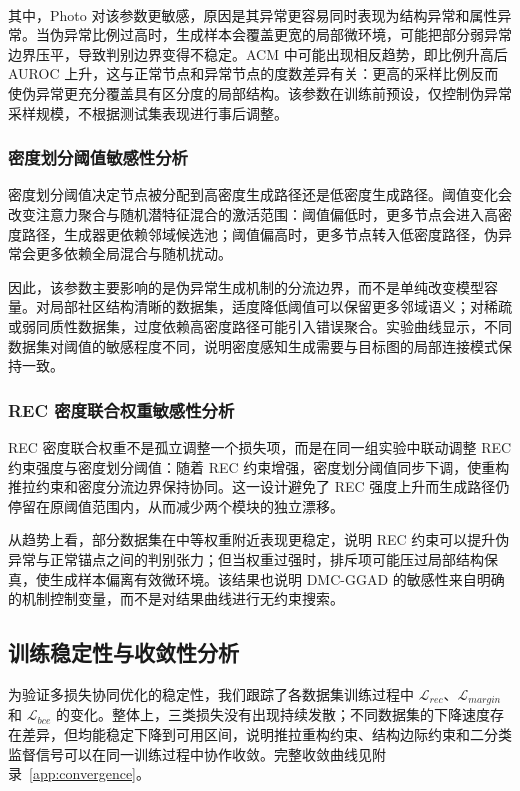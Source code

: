 ﻿﻿﻿﻿    \documentclass[conference, onecolumn]{IEEEtran}
\begin{document}
    其中，Photo 对该参数更敏感，原因是其异常更容易同时表现为结构异常和属性异常。当伪异常比例过高时，生成样本会覆盖更宽的局部微环境，可能把部分弱异常边界压平，导致判别边界变得不稳定。ACM 中可能出现相反趋势，即比例升高后 AUROC 上升，这与正常节点和异常节点的度数差异有关：更高的采样比例反而使伪异常更充分覆盖具有区分度的局部结构。该参数在训练前预设，仅控制伪异常采样规模，不根据测试集表现进行事后调整。

    \subsubsection{密度划分阈值敏感性分析}
    密度划分阈值决定节点被分配到高密度生成路径还是低密度生成路径。阈值变化会改变注意力聚合与随机潜特征混合的激活范围：阈值偏低时，更多节点会进入高密度路径，生成器更依赖邻域候选池；阈值偏高时，更多节点转入低密度路径，伪异常会更多依赖全局混合与随机扰动。

    因此，该参数主要影响的是伪异常生成机制的分流边界，而不是单纯改变模型容量。对局部社区结构清晰的数据集，适度降低阈值可以保留更多邻域语义；对稀疏或弱同质性数据集，过度依赖高密度路径可能引入错误聚合。实验曲线显示，不同数据集对阈值的敏感程度不同，说明密度感知生成需要与目标图的局部连接模式保持一致。

    \subsubsection{REC 密度联合权重敏感性分析}
    REC 密度联合权重不是孤立调整一个损失项，而是在同一组实验中联动调整 REC 约束强度与密度划分阈值：随着 REC 约束增强，密度划分阈值同步下调，使重构推拉约束和密度分流边界保持协同。这一设计避免了 REC 强度上升而生成路径仍停留在原阈值范围内，从而减少两个模块的独立漂移。

    从趋势上看，部分数据集在中等权重附近表现更稳定，说明 REC 约束可以提升伪异常与正常锚点之间的判别张力；但当权重过强时，排斥项可能压过局部结构保真，使生成样本偏离有效微环境。该结果也说明 DMC-GGAD 的敏感性来自明确的机制控制变量，而不是对结果曲线进行无约束搜索。

    \subsection{训练稳定性与收敛性分析}
    为验证多损失协同优化的稳定性，我们跟踪了各数据集训练过程中 $\mathcal{L}_{rec}$、$\mathcal{L}_{margin}$ 和 $\mathcal{L}_{bce}$ 的变化。整体上，三类损失没有出现持续发散；不同数据集的下降速度存在差异，但均能稳定下降到可用区间，说明推拉重构约束、结构边际约束和二分类监督信号可以在同一训练过程中协作收敛。完整收敛曲线见附录~\ref{app:convergence}。
\end{document}
